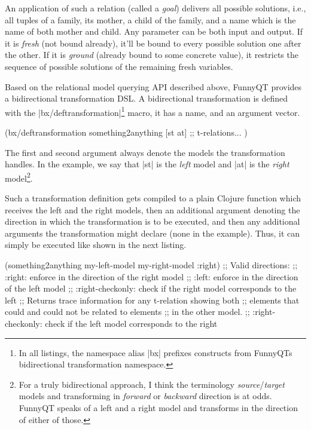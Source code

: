 \documentclass[a4paper]{article}
\newcommand{\code}{\clojureinline}
\begin{document}
An application of such a relation (called a \emph{goal}) delivers all possible
solutions, i.e., all tuples of a family, its mother, a child of the family, and
a name which is the name of both mother and child.  Any parameter can be both
input and output.  If it is \emph{fresh} (not bound already), it'll be bound to
every possible solution one after the other.  If it is \emph{ground} (already
bound to some concrete value), it restricts the sequence of possible solutions
of the remaining fresh variables.

\bigskip{}

Based on the relational model querying API described above, FunnyQT provides a
bidirectional transformation DSL.  A bidirectional transformation is defined
with the \code|bx/deftransformation|\footnote{In all listings, the namespace
  alias \code|bx| prefixes constructs from FunnyQTs bidirectional
  transformation namespace.} macro, it has a name, and an argument vector.

\begin{clojurecode}
(bx/deftransformation something2anything [st at]
  ;; t-relations...
  )
\end{clojurecode}

The first and second argument always denote the models the transformation
handles.  In the example, we say that \code|st| is the \emph{left} model and
\code|at| is the \emph{right} model\footnote{For a truly bidirectional
  approach, I think the terminology \emph{source}/\emph{target} models and
  transforming in \emph{forward} or \emph{backward} direction is at odds.
  FunnyQT speaks of a left and a right model and transforms in the direction of
  either of those.}.

Such a transformation definition gets compiled to a plain Clojure function
which receives the left and the right models, then an additional argument
denoting the direction in which the transformation is to be executed, and then
any additional arguments the transformation might declare (none in the
example).  Thus, it can simply be executed like shown in the next listing.

\begin{clojurecode}
(something2anything my-left-model my-right-model :right)
;; Valid directions:
;; :right: enforce in the direction of the right model
;; :left:  enforce in the direction of the left model
;; :right-checkonly: check if the right model corresponds to the left
;;         Returns trace information for any t-relation showing both
;;         elements that could and could not be related to elements
;;         in the other model.
;; :right-checkonly: check if the left model corresponds to the right
\end{clojurecode}
\end{document}

